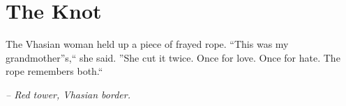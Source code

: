 \chapter*{The Knot}

The Vhasian woman held up a piece of frayed rope. ``This was my grandmother''s,`` she said. ''She cut it twice. Once for love. Once for hate. The rope remembers both.``

\smallskip

\noindent \textit{-- Red tower, Vhasian border.}

